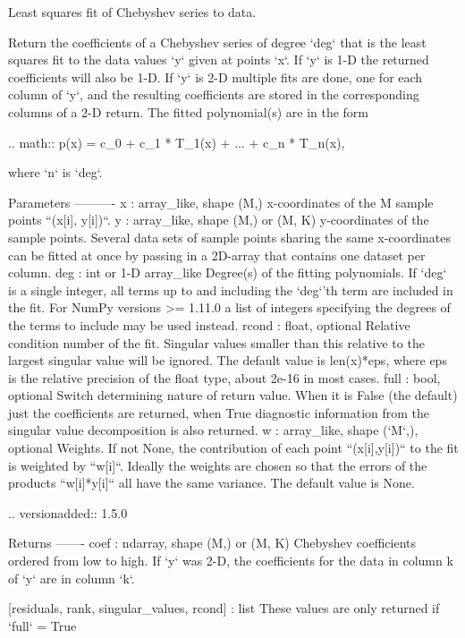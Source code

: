\begin{DoxyVerb}Least squares fit of Chebyshev series to data.

Return the coefficients of a Chebyshev series of degree `deg` that is the
least squares fit to the data values `y` given at points `x`. If `y` is
1-D the returned coefficients will also be 1-D. If `y` is 2-D multiple
fits are done, one for each column of `y`, and the resulting
coefficients are stored in the corresponding columns of a 2-D return.
The fitted polynomial(s) are in the form

.. math::  p(x) = c_0 + c_1 * T_1(x) + ... + c_n * T_n(x),

where `n` is `deg`.

Parameters
----------
x : array_like, shape (M,)
    x-coordinates of the M sample points ``(x[i], y[i])``.
y : array_like, shape (M,) or (M, K)
    y-coordinates of the sample points. Several data sets of sample
    points sharing the same x-coordinates can be fitted at once by
    passing in a 2D-array that contains one dataset per column.
deg : int or 1-D array_like
    Degree(s) of the fitting polynomials. If `deg` is a single integer,
    all terms up to and including the `deg`'th term are included in the
    fit. For NumPy versions >= 1.11.0 a list of integers specifying the
    degrees of the terms to include may be used instead.
rcond : float, optional
    Relative condition number of the fit. Singular values smaller than
    this relative to the largest singular value will be ignored. The
    default value is len(x)*eps, where eps is the relative precision of
    the float type, about 2e-16 in most cases.
full : bool, optional
    Switch determining nature of return value. When it is False (the
    default) just the coefficients are returned, when True diagnostic
    information from the singular value decomposition is also returned.
w : array_like, shape (`M`,), optional
    Weights. If not None, the contribution of each point
    ``(x[i],y[i])`` to the fit is weighted by ``w[i]``. Ideally the
    weights are chosen so that the errors of the products ``w[i]*y[i]``
    all have the same variance.  The default value is None.

    .. versionadded:: 1.5.0

Returns
-------
coef : ndarray, shape (M,) or (M, K)
    Chebyshev coefficients ordered from low to high. If `y` was 2-D,
    the coefficients for the data in column k  of `y` are in column
    `k`.

[residuals, rank, singular_values, rcond] : list
    These values are only returned if `full` = True


\end{DoxyVerb}
